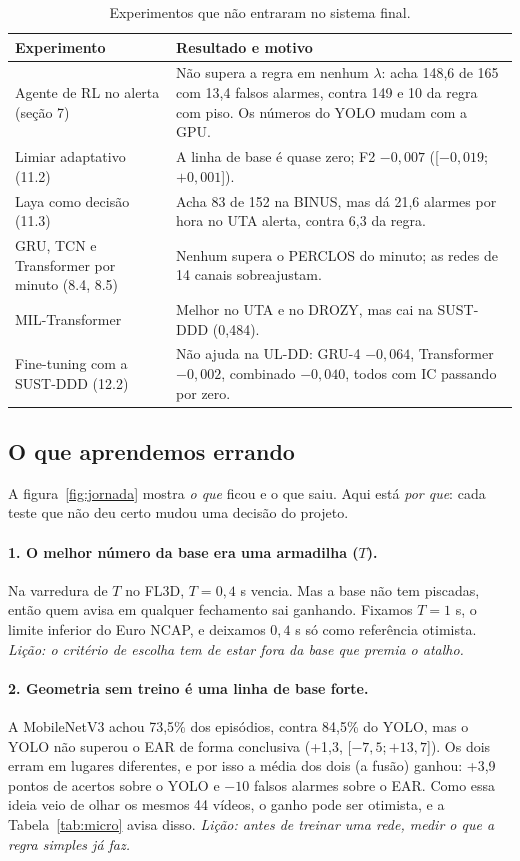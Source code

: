 \documentclass[11pt,a4paper]{article}
\newcommand{\ic}[2]{\textcolor{black!65}{[$#1$;\,$#2$]}}  %
\begin{document}
\begin{table}[!t]
\centering\small
\caption{Experimentos que não entraram no sistema final.}
\label{tab:neg}
\begin{tabularx}{\textwidth}{@{}>{\raggedright\arraybackslash}p{3.7cm}>{\raggedright\arraybackslash}X@{}}
\toprule
Experimento & Resultado e motivo\\
\midrule
Agente de RL no alerta (seção 7) & Não supera a regra em nenhum $\lambda$: acha 148,6 de 165 com 13,4 falsos alarmes, contra 149 e 10 da regra com piso. Os números do YOLO mudam com a GPU.\\
Limiar adaptativo (11.2) & A linha de base é quase zero; F2 $-0{,}007$ (\ic{-0{,}019}{+0{,}001}).\\
Laya como decisão (11.3) & Acha 83 de 152 na BINUS, mas dá 21,6 alarmes por hora no UTA alerta, contra 6,3 da regra.\\
GRU, TCN e Transformer por minuto (8.4, 8.5) & Nenhum supera o PERCLOS do minuto; as redes de 14 canais sobreajustam.\\
MIL-Transformer & Melhor no UTA e no DROZY, mas cai na SUST-DDD (0,484).\\
Fine-tuning com a SUST-DDD (12.2) & Não ajuda na UL-DD: GRU-4 $-0{,}064$, Transformer $-0{,}002$, combinado $-0{,}040$, todos com IC passando por zero.\\
\bottomrule
\end{tabularx}
\end{table}

\subsection{O que aprendemos errando}
\label{sec:licoes}

A figura~\ref{fig:jornada} mostra \emph{o que} ficou e o que saiu. Aqui está \emph{por que}: cada teste que não deu certo mudou uma decisão do projeto.

\paragraph{1. O melhor número da base era uma armadilha ($T$).} Na varredura de $T$ no FL3D, $T = 0{,}4$ s vencia. Mas a base não tem piscadas, então quem avisa em qualquer fechamento sai ganhando. Fixamos $T = 1$ s, o limite inferior do Euro NCAP, e deixamos $0{,}4$ s só como referência otimista. \emph{Lição: o critério de escolha tem de estar fora da base que premia o atalho.}

\paragraph{2. Geometria sem treino é uma linha de base forte.} A MobileNetV3 achou 73,5\% dos episódios, contra 84,5\% do YOLO, mas o YOLO não superou o EAR de forma conclusiva (+1,3, \ic{-7{,}5}{+13{,}7}). Os dois erram em lugares diferentes, e por isso a média dos dois (a fusão) ganhou: +3,9 pontos de acertos sobre o YOLO e $-10$ falsos alarmes sobre o EAR. Como essa ideia veio de olhar os mesmos 44 vídeos, o ganho pode ser otimista, e a Tabela~\ref{tab:micro} avisa disso. \emph{Lição: antes de treinar uma rede, medir o que a regra simples já faz.}
\end{document}
